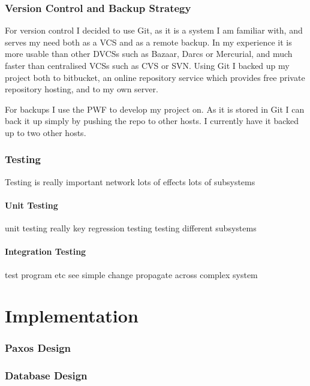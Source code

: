 \documentclass[12pt,twoside,notitlepage]{report}
\begin{document}
\subsection{Version Control and Backup Strategy}

For version control I decided to use Git, as it is a system I am familiar with, and serves my need
both as a VCS and as a remote backup. In my experience it is more usable than other DVCSs such as
Bazaar, Darcs or Mercurial, and much faster than centralised VCSs such as CVS or SVN. Using Git I
backed up my project both to bitbucket, an online repository service which provides free private
repository hosting, and to my own server.

For backups I use the PWF to develop my project on. As it is stored in Git I can back it up simply
by pushing the repo to other hosts. I currently have it backed up to two other hosts.

\subsection{Testing}

Testing is really important
network
lots of effects
lots of subsystems

\subsubsection{Unit Testing}

unit testing really key
regression testing
testing different subsystems

\subsubsection{Integration Testing}

test program etc
see simple change propagate across complex system



\cleardoublepage
\chapter{Implementation}

\subsection{Paxos Design}

\subsection{Database Design}
\end{document}
